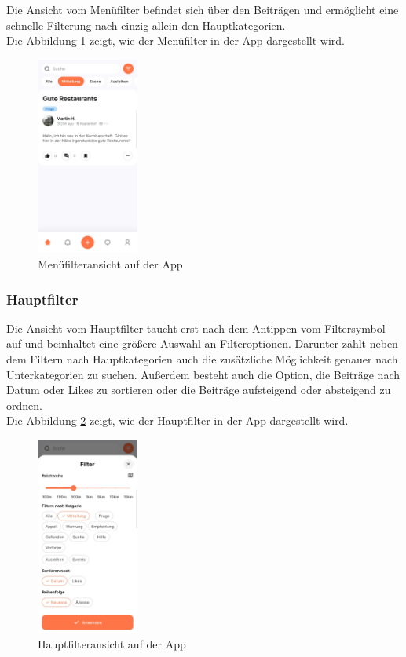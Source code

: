 Die Ansicht vom Menüfilter befindet sich über den Beiträgen und ermöglicht eine schnelle Filterung nach einzig allein den Hauptkategorien.
\\
Die Abbildung \ref{fig:menu-filter} zeigt, wie der Menüfilter in der App dargestellt wird.

\begin{figure}[H]
  \centering
  \includegraphics[width=0.3\textwidth]{pics/menu-filter.jpg}
  \caption{Menüfilteransicht auf der App}
  \label{fig:menu-filter}
\end{figure}

\subsubsection{Hauptfilter}

Die Ansicht vom Hauptfilter taucht erst nach dem Antippen vom Filtersymbol auf und beinhaltet eine größere Auswahl an Filteroptionen. Darunter zählt neben dem Filtern nach Hauptkategorien auch die zusätzliche Möglichkeit genauer nach Unterkategorien zu suchen. Außerdem besteht auch die Option, die Beiträge nach Datum oder Likes zu sortieren oder die Beiträge aufsteigend oder absteigend zu ordnen.
\\
Die Abbildung \ref{fig:main-filter} zeigt, wie der Hauptfilter in der App dargestellt wird.

\begin{figure}[H]
  \centering
  \includegraphics[width=0.3\textwidth]{pics/main-filter.jpg}
  \caption{Hauptfilteransicht auf der App}
  \label{fig:main-filter}
\end{figure}

